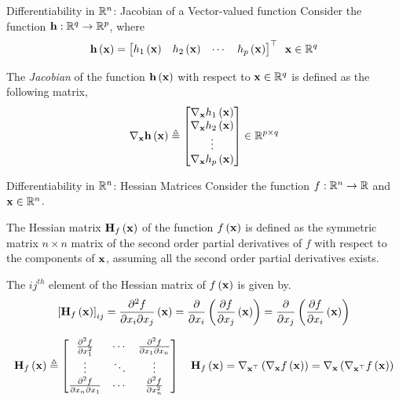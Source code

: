 \documentclass[aspectratio=169]{beamer}
\def\mf{\ensuremath\mathbf}
\def\mb{\ensuremath\mathbb}
\def\lp{\ensuremath\left(}
\def\rp{\ensuremath\right)}
\def\ls{\ensuremath\left[}
\def\rs{\ensuremath\right]}
\def\bmx{\ensuremath\begin{bmatrix*}[r]}
\def\emx{\ensuremath\end{bmatrix*}}
\def\bmxc{\ensuremath\begin{bmatrix*}[c]}
\def\R{\ensuremath\mb{R}}
\newcommand{\ct}[1]{\lp #1\rp}
\begin{document}
\begin{frame}[t]{Differentiability in $\R^n$: Jacobian of a Vector-valued function}
  Consider the function $\mf{h}: \R^q \to \R^p$, where
  \[ \mf{h}\ct{\mf{x}} = \bmx h_1\ct{\mf{x}} & h_2\ct{\mf{x}} & \cdots & h_p\ct{\mf{x}} \emx^\top \,\,\, \mf{x} \in \R^q \]

  The \textit{Jacobian} of the function $\mf{h}\ct{\mf{x}}$ with respect to $\mf{x} \in \R^q$ is defined as the following matrix,
  \[ \nabla_{\mf{x}} \mf{h}\ct{\mf{x}} \triangleq \bmxc \nabla_{\mf{x}} h_1\ct{\mf{x}} \\ \nabla_{\mf{x}} h_2\ct{\mf{x}} \\ \vdots \\ \nabla_{\mf{x}} h_p\ct{\mf{x}}\emx \in \R^{p \times q}\]
\end{frame}


\begin{frame}[t]{Differentiability in $\R^n$: Hessian Matrices}
  Consider the function $f: \R^n \to \R$ and $\mf{x} \in \R^n$. 
  \vspace{0.25cm}

  The Hessian matrix $\mf{H}_f\ct{\mf{x}}$ of the function $f\ct{\mf{x}}$  is defined as the symmetric matrix $n \times n$ matrix of the second order partial derivatives of $f$ with respect to the components of $\mf{x}$, assuming all the second order partial derivatives exists.
  \vspace{0.25cm}

  The $ij^{th}$ element of the Hessian matrix of $f\ct{\mf{x}}$ is given by.
  \[ \ls \mf{H}_f\ct{\mf{x}}\rs_{ij} = \frac{\partial^2 f}{\partial x_i \partial x_j}\ct{\mf{x}} = \frac{\partial}{\partial x_i}\ct{\frac{\partial f}{\partial x_j}\ct{\mf{x}}} = \frac{\partial}{\partial x_j}\ct{\frac{\partial f}{\partial x_i}\ct{\mf{x}}} \]

  \[ \mf{H}_f\ct{\mf{x}} \triangleq \bmxc \frac{\partial^2 f}{\partial x_1^2} & \cdots & \frac{\partial^2 f}{\partial x_1 \partial x_n} \\
  \vdots & \ddots & \vdots \\
  \frac{\partial^2 f}{\partial x_n \partial x_1} & \cdots & \frac{\partial^2 f}{\partial x_n^2} \emx \quad \mf{H}_f\ct{\mf{x}} = \nabla_{\mf{x}^\top}\ct{\nabla_{\mf{x}} f\ct{\mf{x}}} = \nabla_{\mf{x}}\ct{\nabla_{\mf{x}^\top} f\ct{\mf{x}}} \]
\end{frame}
\end{document}
